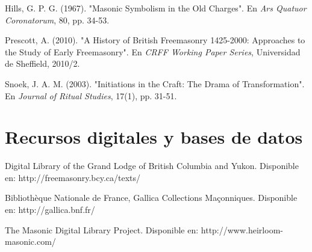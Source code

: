 \documentclass[a4paper,12pt,twoside]{book}
\begin{document}
Hills, G. P. G. (1967). "Masonic Symbolism in the Old Charges". En \textit{Ars Quatuor Coronatorum}, 80, pp. 34-53.

Prescott, A. (2010). "A History of British Freemasonry 1425-2000: Approaches to the Study of Early Freemasonry". En \textit{CRFF Working Paper Series}, Universidad de Sheffield, 2010/2.

Snoek, J. A. M. (2003). "Initiations in the Craft: The Drama of Transformation". En \textit{Journal of Ritual Studies}, 17(1), pp. 31-51.


\section*{Recursos digitales y bases de datos}

Digital Library of the Grand Lodge of British Columbia and Yukon. Disponible en: http://freemasonry.bcy.ca/texts/

Bibliothèque Nationale de France, Gallica Collections Maçonniques. Disponible en: http://gallica.bnf.fr/

The Masonic Digital Library Project. Disponible en: http://www.heirloom-masonic.com/
\end{document}
